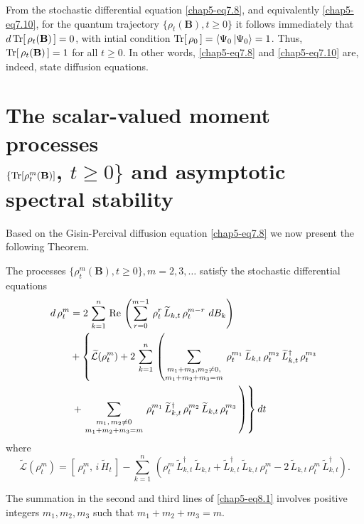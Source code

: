 From the stochastic differential equation \eqref{chap5-eq7.8}, and equivalently \eqref{chap5-eq7.10}, for the  quantum trajectory $\{\rho_t(\mathbf{B}), t\geq 0\}$ it follows immediately that  $d\, {\rm Tr}[\,\rho_t(\mathbf{B})\,]=0$, with intial condition ${\rm Tr}[\,\rho_0\,]=\langle \Psi_0\,\vert \Psi_0\rangle=1$. Thus, ${\rm Tr}[\,\rho_t (\mathbf{B})\,]=1$ for all $t\geq 0$. In other words, \eqref{chap5-eq7.8} and \eqref{chap5-eq7.10} are, indeed, state diffusion equations.   

\section{The scalar-valued  moment processes   \\ $\{{\rm Tr}[\rho_t^m(\mathbf{B})]$, $t\geq 0\}$ and  asymptotic  spectral stability} \label{chap5-eq8}

Based on the Gisin-Percival diffusion equation \eqref{chap5-eq7.8}  we now present the following Theorem. 

\begin{thm}\label{chap5-thm3}
The  processes $\{\rho_t^m(\mathbf{B}), t\geq 0\}, m=2,3,\ldots$ satisfy the stochastic differential equations   
\begin{align} 
d\, \rho_t^m &= 2\, \sum_{k=1}^{n}\,  {\rm Re}\, \left( \sum_{r=0}^{m-1}\, \rho_t^r\, \widetilde{L}_{k,t}\, \rho^{m-r}_t\ dB_{k}\right)    \nonumber \\
& +\left\{  \widetilde{\mathcal{L}}(\rho_t^m) + 2\, \sum_{k=1}^n\, \left(\mathop{\sum_{m_1+m_3, m_2\neq 0,}^{}}_{m_1+m_2+m_3=m}\,    \rho_t^{m_1}\, \widetilde{L}_{k,t}\, \rho_t^{m_2}\, \widetilde{L}_{k,t}^\dag\, \rho_t^{m_3} \right. \right. \nonumber \\ 
&\left.\left.    +   \, \mathop{\sum_{m_1,\, m_2\neq 0}^{}}_{m_1+m_2+m_3=m}\,  \rho_t^{m_1}\, \widetilde{L}^\dag_{k,t}\, \rho_t^{m_2}\, \widetilde{L}_{k,t}\, \rho_t^{m_3}\, \right) \right\} dt  \label{chap5-eq8.1}
\end{align}
where  
\begin{equation}
\widetilde{\mathcal{L}}(\rho_t^m)=\left[\,\rho_t^m,\, i\, \widetilde{H}_t\, \right]- \sum_{k=1}^n\,\left(\rho_t^m\, \widetilde{L}_{k,t}^\dag\,\widetilde{L}_{k,t} + \widetilde{L}^\dag_{k,t}\,\widetilde{L}_{k,t}\, \rho_t^m - 2\, \widetilde{L}_{k,t}\, \rho_t^m\, \widetilde{L}_{k,t}^\dag\right).\label{chap5-eq8.2}
\end{equation}
\end{thm}
The summation in the second and third lines of \eqref{chap5-eq8.1} involves positive integers $m_1,m_2,m_3$ such that $m_1+m_2+m_3=m$.   

